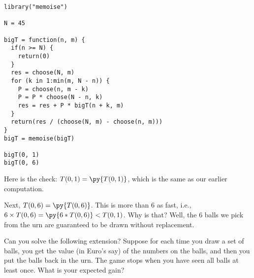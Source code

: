 \documentclass[lectures]{subfiles}
\begin{document}
\begin{exercise}
\begin{solution}
\begin{pyblock}
\end{pyblock}
\begin{verbatim}
library("memoise")

N = 45

bigT = function(n, m) {
  if(n >= N) {
    return(0)
  }
  res = choose(N, m)
  for (k in 1:min(m, N - n)) {
    P = choose(n, m - k)
    P = P * choose(N - n, k)
    res = res + P * bigT(n + k, m)
  }
  return(res / (choose(N, m) - choose(n, m)))
}
bigT = memoise(bigT)

bigT(0, 1)
bigT(0, 6)
\end{verbatim}
Here is the check: $T(0, 1) = \py{T(0, 1)}$, which is the same as our earlier computation.

Next, $T(0, 6) = \py{T(0,6)}$.
This is more than $6$ as fast, i.e., $6\times T(0, 6) = \py{6*T(0, 6)} < T(0,1)$.
Why is that?
Well, the 6 balls we pick from the urn are guaranteed to be drawn without replacement.


Can you solve the following extension? Suppose for each time you draw a set of balls, you get the value (in Euro's say) of the numbers on the balls, and then you put the balls back in the urn.
The game stops when you have seen all balls at least once. What is your expected gain?

\end{solution}
\end{exercise}
\end{document}
